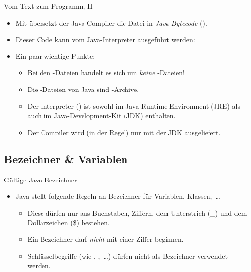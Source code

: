 \begin{frame}{Vom Text zum Programm, II}
    \begin{itemize}[<+(1)->]
        \widei
        \item Mit  übersetzt der Java-Compiler die Datei in \emph{Java-Bytecode}\pause{} ().
        \item Dieser Code kann vom Java-Interpreter ausgeführt werden:\pause{} 
        \item Ein paar wichtige Punkte: \begin{itemize}
            \widei
            \item Bei den -Dateien handelt es sich um \emph{keine} -Dateien!
            \item Die -Dateien von Java sind -Archive.
            \item Der Interpreter () ist sowohl im Java-Runtime-Environment (JRE) als auch im Java-Development-Kit (JDK) enthalten.
            \item Der Compiler wird (in der Regel) nur mit der JDK ausgeliefert.
        \end{itemize}
    \end{itemize}
\end{frame}

\subsection{Bezeichner \& Variablen}

\begin{frame}{Gültige Java-Bezeichner}
    \begin{itemize}[<+(1)->]
        \widei
        \item Java stellt folgende Regeln an Bezeichner für Variablen, Klassen,~\ldots \begin{itemize}
            \widei
            \item Diese dürfen nur aus Buchstaben, Ziffern, dem Unterstrich (\_) und dem Dollarzeichen (\$) bestehen.
            \item Ein Bezeichner darf \emph{nicht} mit einer Ziffer beginnen.
            \item Schlüsselbegriffe (wie , ,~\ldots) dürfen nicht als Bezeichner verwendet werden.
        \end{itemize}
    \end{itemize}
\end{frame}

